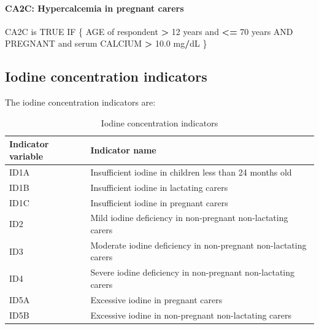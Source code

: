 \documentclass[12pt,a4paper]{article}
\newenvironment{Shaded}{\begin{snugshade}}{\end{snugshade}}
\newcommand{\DecValTok}[1]{\textcolor[rgb]{0.00,0.00,0.81}{#1}}
\newcommand{\FloatTok}[1]{\textcolor[rgb]{0.00,0.00,0.81}{#1}}
\newcommand{\NormalTok}[1]{#1}
\newcommand{\OperatorTok}[1]{\textcolor[rgb]{0.81,0.36,0.00}{\textbf{#1}}}
\newcommand{\OtherTok}[1]{\textcolor[rgb]{0.56,0.35,0.01}{#1}}
\newcommand{\StringTok}[1]{\textcolor[rgb]{0.31,0.60,0.02}{#1}}
\let\oldparagraph\paragraph
\renewcommand{\paragraph}[1]{\oldparagraph{#1}\mbox{}}
\begin{document}
\hypertarget{ca2c-hypercalcemia-in-pregnant-carers}{%
\paragraph{CA2C: Hypercalcemia in pregnant carers}\label{ca2c-hypercalcemia-in-pregnant-carers}}

\begin{Shaded}
\begin{Highlighting}[]
\NormalTok{CA2C is }\OtherTok{TRUE}\NormalTok{ IF}
\NormalTok{  \{}
\NormalTok{    AGE of respondent }\OperatorTok{>}\StringTok{ }\DecValTok{12}\NormalTok{ years and }\OperatorTok{<=}\StringTok{ }\DecValTok{70}\NormalTok{ years AND }
\NormalTok{      PREGNANT and serum CALCIUM }\OperatorTok{>}\StringTok{ }\FloatTok{10.0}\NormalTok{ mg}\OperatorTok{/}\NormalTok{dL}
\NormalTok{  \}}
\end{Highlighting}
\end{Shaded}

\hypertarget{iodine-concentration-indicators}{%
\subsection{Iodine concentration indicators}\label{iodine-concentration-indicators}}

The iodine concentration indicators are:

\begin{table}[H]

\caption{\label{tab:iodl1}Iodine concentration indicators}
\centering
\begin{tabular}[t]{ll}
\toprule
\textbf{Indicator variable} & \textbf{Indicator name}\\
\midrule
\rowcolor{gray!6}  ID1A & Insufficient iodine in children less than 24 months old\\
ID1B & Insufficient iodine in lactating carers\\
\rowcolor{gray!6}  ID1C & Insufficient iodine in pregnant carers\\
ID2 & Mild iodine deficiency in non-pregnant non-lactating carers\\
\rowcolor{gray!6}  ID3 & Moderate iodine deficiency in non-pregnant non-lactating carers\\
\addlinespace
ID4 & Severe iodine deficiency in non-pregnant non-lactating carers\\
\rowcolor{gray!6}  ID5A & Excessive iodine in pregnant carers\\
ID5B & Excessive iodine in non-pregnant non-lactating carers\\
\bottomrule
\end{tabular}
\end{table}
\end{document}
